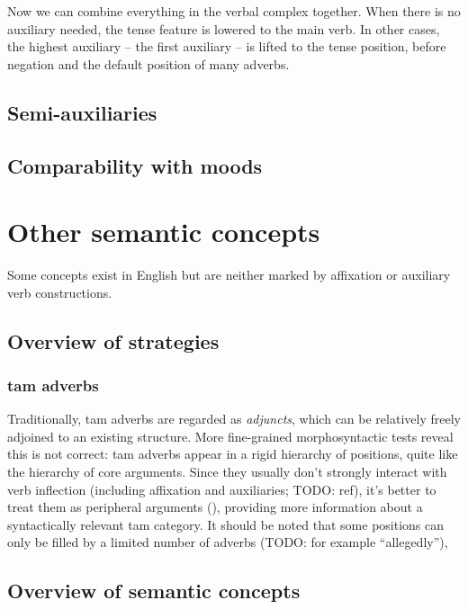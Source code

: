 \documentclass[UTF8, a4paper, oneside, scheme=plain]{ctexrep}
\newcommand*{\term}[1]{\emph{#1}}
\begin{document}
Now we can combine everything in the verbal complex together.
When there is no auxiliary needed,
the tense feature is lowered to the main verb. 
In other cases, the highest auxiliary -- the first auxiliary -- 
is lifted to the tense position,
before negation and the default position of many adverbs.

\subsection{Semi-auxiliaries}\label{sec:semi-auxiliary}

\subsection{Comparability with moods}\label{sec:tam-mood-compatibility}


\section{Other semantic concepts}

Some concepts exist in English but are neither marked by affixation or auxiliary verb constructions.

\subsection{Overview of strategies}

\subsubsection{\acs{tam} adverbs}\label{sec:tam.adverbs}

Traditionally, \acs{tam} adverbs are regarded as \term{adjuncts},
which can be relatively freely adjoined to an existing structure.
More fine-grained morphosyntactic tests reveal this is not correct:
\acs{tam} adverbs appear in a rigid hierarchy of positions, 
quite like the hierarchy of core arguments.
Since they usually don't strongly interact with verb inflection
(including affixation and auxiliaries; TODO: ref),
it's better to treat them as peripheral arguments (),
providing more information about a syntactically relevant \acs{tam} category.
It should be noted that some positions can only be filled by a limited number of adverbs (TODO: for example ``allegedly''),

\subsection{Overview of semantic concepts}
\end{document}
